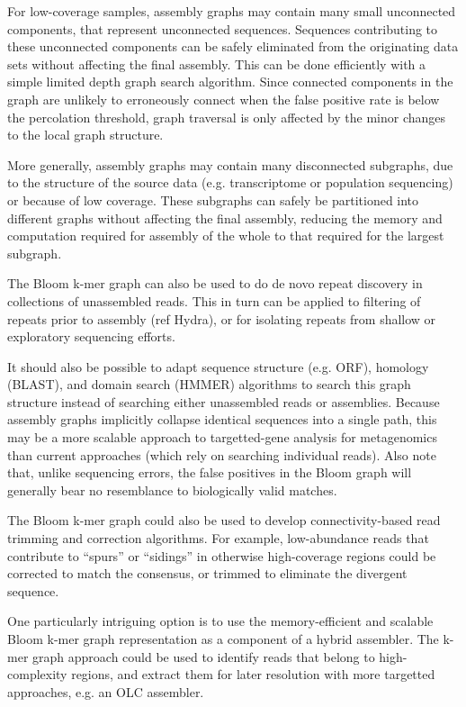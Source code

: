 \documentclass[12pt]{article} \usepackage{simplemargins}
\begin{document}
For low-coverage samples, assembly graphs may contain many small
unconnected components, that represent unconnected sequences.
Sequences contributing to these unconnected components can be safely
eliminated from the originating data sets without affecting the final
assembly.  This can be done efficiently with a simple limited depth
graph search algorithm. Since connected components in the graph 
are unlikely to erroneously connect when the false positive rate 
is below the percolation threshold, graph traversal is only affected 
by the minor changes to the local graph structure.

More generally, assembly graphs may contain many disconnected
subgraphs, due to the structure of the source data (e.g. transcriptome
or population sequencing) or because of low coverage.  These subgraphs
can safely be partitioned into different graphs without affecting the
final assembly, reducing the memory and computation required for
assembly of the whole to that required for the largest subgraph.

The Bloom k-mer graph can also be used to do de novo repeat discovery
in collections of unassembled reads.  This in turn can be applied to
filtering of repeats prior to assembly (ref Hydra), or for isolating
repeats from shallow or exploratory sequencing efforts.

It should also be possible to adapt sequence structure (e.g. ORF),
homology (BLAST), and domain search (HMMER) algorithms to search this
graph structure instead of searching either unassembled reads or
assemblies.  Because assembly graphs implicitly collapse identical
sequences into a single path, this may be a more scalable approach to
targetted-gene analysis for metagenomics than current approaches
(which rely on searching individual reads).  Also note that, unlike
sequencing errors, the false positives in the Bloom graph will
generally bear no resemblance to biologically valid matches.

The Bloom k-mer graph could also be used to develop connectivity-based
read trimming and correction algorithms.  For example, low-abundance
reads that contribute to ``spurs'' or ``sidings'' in otherwise
high-coverage regions could be corrected to match the
consensus, or trimmed to eliminate the divergent sequence.

One particularly intriguing option is to use the memory-efficient and
scalable Bloom k-mer graph representation as a component of a hybrid
assembler.  The k-mer graph approach could be used to identify
reads that belong to high-complexity regions, and extract them for
later resolution with more targetted approaches, e.g. an OLC assembler.
\end{document}
